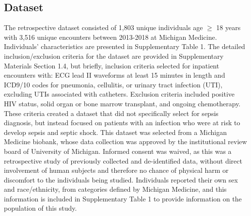 


\subsection*{Dataset} \label{sec:methods_dataset}

The retrospective dataset consisted of 1,803 unique individuals age $\geq$ 18 years with 3,516 unique encounters between 2013-2018 at Michigan Medicine. Individuals' characteristics are presented in Supplementary Table 1. The detailed inclusion/exclusion criteria for the dataset are provided in Supplementary Materials Section 1.4, but briefly, inclusion criteria selected for inpatient encounters with: ECG lead II waveforms at least 15 minutes in length and ICD9/10 codes for pneumonia, cellulitis, or urinary tract infection (UTI), excluding UTIs associated with catheters. Exclusion criteria included positive HIV status, solid organ or bone marrow transplant, and ongoing chemotherapy. These criteria created a dataset that did not specifically select for sepsis diagnosis, but instead focused on patients with an infection who were at risk to develop sepsis and septic shock. This dataset was selected from a Michigan Medicine biobank, whose data collection was approved by the institutional review board of University of Michigan. Informed consent was waived, as this was a retrospective study of previously collected and de-identified data, without direct involvement of human subjects and therefore no chance of physical harm or discomfort to the individuals being studied. Individuals reported their own sex and race/ethnicity, from categories defined by Michigan Medicine, and this information is included in Supplementary Table 1 to provide information on the population of this study.

